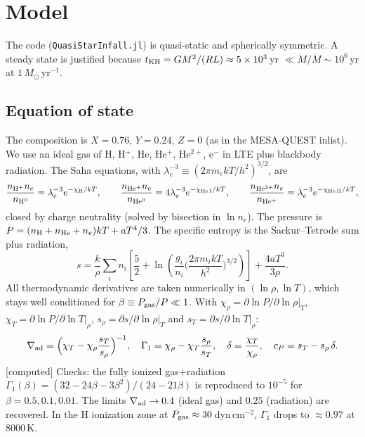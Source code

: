 \documentclass[11pt]{article}
\newcommand{\Msun}{M_\odot}
\newcommand{\Mdot}{\dot M}
\newcommand{\status}[1]{\textsf{\small\textcolor{black!60}{[#1]}}}
\begin{document}
\section{Model}\label{sec:model}
The code (\texttt{QuasiStarInfall.jl}) is quasi-static and spherically symmetric. A steady state is
justified because $t_{\rm KH}=GM^2/(RL)\approx5\times10^3$\,yr $\ll M/\Mdot\sim10^6$\,yr at $1\,\Msun$\,yr$^{-1}$.

\subsection{Equation of state}
The composition is $X=0.76$, $Y=0.24$, $Z=0$ (as in the MESA-QUEST inlist). We use an ideal gas of
H, H$^+$, He, He$^+$, He$^{2+}$, e$^-$ in LTE plus blackbody radiation. The Saha equations, with
$\lambda_e^{-3}\equiv(2\pi m_ekT/h^2)^{3/2}$, are
\begin{equation}
\frac{n_{\rm H^+}n_e}{n_{\rm H^0}}=\lambda_e^{-3}e^{-\chi_{\rm H}/kT},\qquad
\frac{n_{\rm He^+}n_e}{n_{\rm He^0}}=4\lambda_e^{-3}e^{-\chi_{\rm He\,I}/kT},\qquad
\frac{n_{\rm He^{2+}}n_e}{n_{\rm He^+}}=\lambda_e^{-3}e^{-\chi_{\rm He\,II}/kT},
\end{equation}
closed by charge neutrality (solved by bisection in $\ln n_e$). The pressure is
$P=(n_{\rm H}+n_{\rm He}+n_e)kT+aT^4/3$. The specific entropy is the Sackur--Tetrode sum plus radiation,
\begin{equation}
s=\frac{k}{\rho}\sum_i n_i\left[\frac52+\ln\!\left(\frac{g_i}{n_i}\Big(\frac{2\pi m_ikT}{h^2}\Big)^{3/2}\right)\right]
+\frac{4aT^3}{3\rho}.
\end{equation}
All thermodynamic derivatives are taken numerically in $(\ln\rho,\ln T)$, which stays well conditioned for
$\beta\equiv P_{\rm gas}/P\ll1$. With $\chi_\rho=\partial\ln P/\partial\ln\rho|_T$, $\chi_T=\partial\ln P/\partial\ln T|_\rho$,
$s_\rho=\partial s/\partial\ln\rho|_T$ and $s_T=\partial s/\partial\ln T|_\rho$:
\begin{equation}
\nabla_{\rm ad}=\Big(\chi_T-\chi_\rho\frac{s_T}{s_\rho}\Big)^{-1},\quad
\Gamma_1=\chi_\rho-\chi_T\frac{s_\rho}{s_T},\quad
\delta=\frac{\chi_T}{\chi_\rho},\quad
c_P=s_T-s_\rho\,\delta .
\end{equation}
\status{computed} Checks: the fully ionized gas$+$radiation $\Gamma_1(\beta)=(32-24\beta-3\beta^2)/(24-21\beta)$ is
reproduced to $10^{-5}$ for $\beta=0.5,0.1,0.01$. The limits $\nabla_{\rm ad}\to0.4$ (ideal gas) and $0.25$ (radiation)
are recovered. In the H ionization zone at $P_{\rm gas}\approx30$\,dyn\,cm$^{-2}$, $\Gamma_1$ drops to $\approx0.97$ at 8000\,K.
\end{document}
